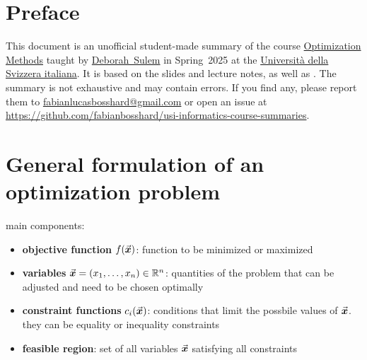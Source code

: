 \pagestyle{plain}


\maketitle
\tableofcontents


\section*{Preface}

This document is an unofficial student-made summary of the course 
\href{https://search.usi.ch/en/courses/35270756/optimization-methods}{{Optimization Methods}} taught by \href{https://search.usi.ch/en/people/7ae0ccfefe31ec77de71003997572fbd/sulem-deborah}{Deborah~Sulem} in Spring~2025 at the \href{https://www.usi.ch/en}{Università della Svizzera italiana}.
It is based on the slides and lecture notes, as well as \cite{nocedal2006}.
The summary is not exhaustive and may contain errors.
If you find any, please report them to \href{mailto:fabianlucasbosshard@gmail.com}{fabianlucasbosshard@gmail.com} or open an issue at \url{https://github.com/fabianbosshard/usi-informatics-course-summaries}.

\doclicenseThis

\renewcommand{\emph}[1]{\textcolor{black}{#1}}
\printbibliography[heading=bibintoc,title={References}]
\renewcommand{\emph}[1]{\textcolor{mypurple}{#1}}













\clearpage
{}
\pagestyle{scrheadings}
\section{General formulation of an optimization problem}

main components:
\begin{itemize}
	\item \textbf{objective function} $f(\vec{\boldsymbol{x}})$: function to be minimized or maximized
	\item \textbf{variables} $\vec{\boldsymbol{x}} = (x_1, \ldots, x_n) \in \mathbb{R}^n$: quantities of the problem that can be adjusted and need to be chosen \emph{optimally}
	\item \textbf{constraint functions} $c_i(\vec{\boldsymbol{x}})$: conditions that limit the possbile values of $\vec{\boldsymbol{x}}$. they can be \emph{equality} or \emph{inequality} constraints
	\item \textbf{feasible region}: set of all variables $\vec{\boldsymbol{x}}$ satisfying all constraints
\end{itemize}

